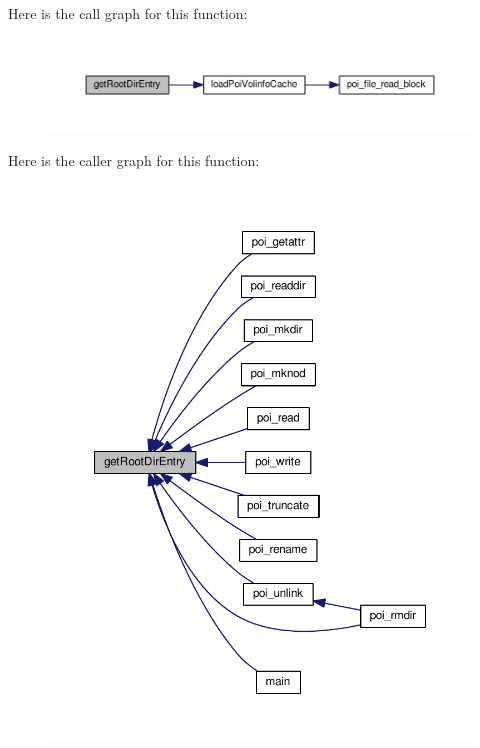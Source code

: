 Here is the call graph for this function\-:\nopagebreak
\begin{figure}[H]
\begin{center}
\leavevmode
\includegraphics[width=350pt]{volume-information_8h_a32c12de0ce0f231386676aca679e459e_cgraph}
\end{center}
\end{figure}




Here is the caller graph for this function\-:\nopagebreak
\begin{figure}[H]
\begin{center}
\leavevmode
\includegraphics[width=350pt]{volume-information_8h_a32c12de0ce0f231386676aca679e459e_icgraph}
\end{center}
\end{figure}


